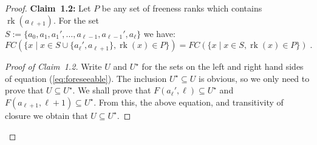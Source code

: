 \documentclass{article}
\theoremstyle{remark}
\theoremstyle{definition}
\DeclareMathOperator{\rk}{rk}
\DeclareMathOperator{\cl}{cl}
\newenvironment{subproof}[1][\proofname]{%
  \renewcommand{\qedsymbol}{$\blacksquare$}%
  \begin{proof}[#1]%
}{%
  \end{proof}%
}
\begin{document}
{\begin{proof}

\textbf{Claim~1.2:} Let $P$ be any set of freeness ranks which contains  $\rk(a_{\ell+1})$. For the set\\ $S:=\{a_0,a_1,a_1', \dots,a_{\ell-1}, a_{\ell-1}', a_\ell\}$ we have:
\begin{equation}\label{eq:foreseeable}
    FC(\{x\; \vert\;   x\in S\cup \{a_\ell', a_{\ell+1}\}, \rk(x)\in P\})=FC(\{x\;\vert\; x\in S, \rk(x)\in P\})\;.
\end{equation}
\begin{subproof}[Proof of Claim~1.2]
Write $U$ and $U^\star$ for the sets on the left and right hand sides of equation (\ref{eq:foreseeable}). The inclusion $U^\star\subseteq U$ is obvious, so we only need to prove that $U\subseteq U^\star$. 
We shall prove that $F(a_\ell', \ell)\subseteq U^\star$ and $F(a_{\ell+1}, \ell+1)\subseteq U^\star$. From this, the above equation, and transitivity of %
{closure} we obtain that $U\subseteq U^\star$. 


\end{subproof}
\end{proof}}
\end{document}
